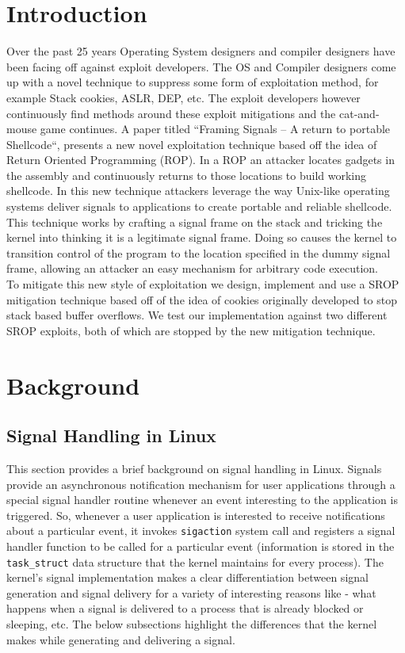 \documentclass{sig-alternate-05-2015}
\begin{document}
\section{Introduction}
Over the past 25 years Operating System designers and compiler designers have been facing off against exploit developers. The OS and Compiler designers  come up with a novel technique to suppress some form of exploitation method, for example Stack cookies, ASLR, DEP, etc. The exploit developers however continuously find methods around these exploit mitigations and the cat-and-mouse game continues.  A paper titled ``Framing Signals -- A return to portable Shellcode``,  presents a new novel exploitation technique based off the idea of Return Oriented Programming (ROP). In a ROP an attacker locates gadgets in the assembly and continuously returns to those locations to build working shellcode. In this new technique attackers leverage the way Unix-like operating systems deliver signals to applications to create portable and reliable shellcode. This technique works by crafting a signal frame on the stack and tricking the kernel into thinking it is a legitimate signal frame. Doing so causes the kernel to transition control of the program to the location specified in the dummy signal frame, allowing an attacker an easy mechanism for arbitrary code execution.\\
\indent
To mitigate this new style of exploitation we design, implement and use a SROP mitigation technique based off of the idea of cookies originally developed to stop stack based buffer overflows. We test our implementation against two different SROP exploits, both of which are stopped by the new mitigation technique.

\section {Background}
\subsection{Signal Handling in Linux}
This section provides a brief background on signal handling in Linux. Signals provide an asynchronous notification mechanism for user applications through a special signal handler routine whenever an event interesting to the application is triggered. So, whenever a user application is interested to receive notifications about a particular event, it invokes {\texttt{sigaction}} system call and registers a signal handler function to be called for a particular event (information is stored in the \texttt{task\_struct} data structure that the kernel maintains for every process). The kernel's signal implementation makes a clear differentiation between signal generation and signal delivery for a variety of interesting reasons like - what happens when a signal is delivered to a process that is already blocked or sleeping, etc. The below subsections highlight the differences that the kernel makes while generating and delivering a signal.
\end{document}

